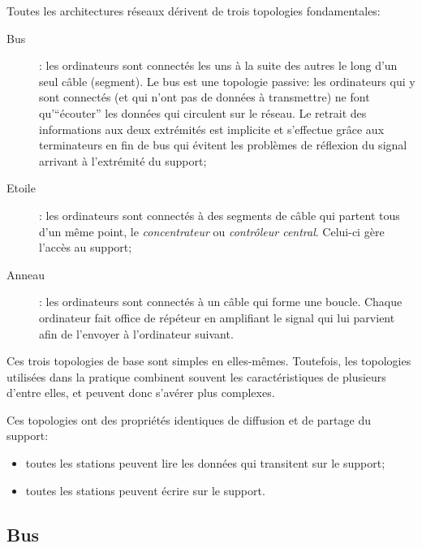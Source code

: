 \documentclass[11pt,english,french]{scrreprt}
\theoremstyle{remark}
\theoremstyle{definition}
\begin{document}
Toutes les architectures réseaux dérivent de trois topologies fondamentales:\begin{description}
	\item [Bus] : les ordinateurs sont connectés les uns à la suite des autres le long d'un seul câble (segment). Le bus est une topologie passive: les ordinateurs qui y sont connectés (et qui n'ont pas de données à transmettre) ne font qu'``écouter'' les données qui circulent sur le réseau. Le retrait des informations aux deux extrémités est implicite et s'effectue grâce aux terminateurs en fin de bus qui évitent les problèmes de réflexion du signal arrivant à l'extrémité du support;
	\item [Etoile] : les ordinateurs sont connectés à des segments de câble qui partent tous d'un même point, le \emph{concentrateur} ou \emph{contrôleur central}. Celui-ci gère l'accès au support;
	\item [Anneau] : les ordinateurs sont connectés à un câble qui forme une boucle. Chaque ordinateur fait office de répéteur en amplifiant le signal qui lui parvient afin de l'envoyer à l'ordinateur suivant.
\end{description}


Ces trois topologies de base sont simples en elles-mêmes. Toutefois, les topologies utilisées dans la pratique combinent souvent les caractéristiques de plusieurs d'entre elles, et peuvent donc s'avérer plus complexes.

Ces topologies ont des propriétés identiques de diffusion et de partage du support:\begin{itemize}
	\item toutes les stations peuvent lire les données qui transitent sur le support;
	\item toutes les stations peuvent écrire sur le support.
\end{itemize}

\subsection{Bus} %
\end{document}
